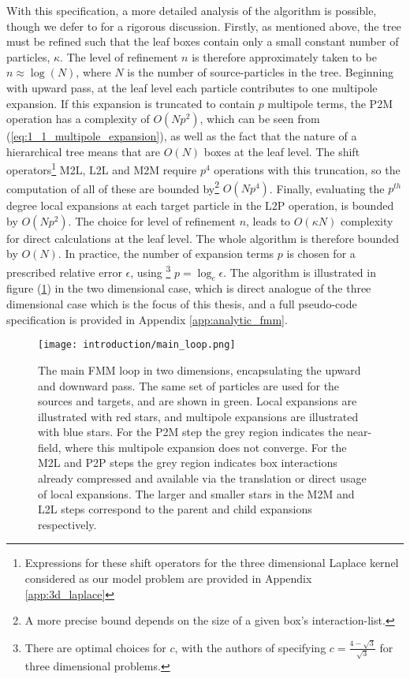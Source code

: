 With this specification, a more detailed analysis of the algorithm is possible,
though we defer to \cite{Greengard:1987:JCP} for a rigorous discussion.
Firstly, as mentioned above, the tree must be refined such that the leaf boxes
contain only a small constant number of particles, $\kappa$. The level of refinement $n$
is therefore approximately taken to be $n \approx \log(N)$, where $N$ is the number
of \gls{source-particles} in the tree. Beginning with upward pass, at the leaf level each particle contributes to one
multipole expansion. If this expansion is truncated to contain $p$ multipole terms, the
\gls{P2M} operation has a complexity of $O(Np^2)$, which can be seen from
(\ref{eq:1_1_multipole_expansion}), as well as the fact that the nature of a
hierarchical tree means that are $O(N)$ boxes at the leaf level. The shift operators\footnote{
    Expressions for these shift operators for the three dimensional Laplace kernel
    considered as our model problem are provided in Appendix \ref{app:3d_laplace}
} \gls{M2L}, \gls{L2L} and \gls{M2M} require $p^4$ operations with this truncation,
so the computation of all of these are bounded by\footnote{A more precise
bound depends on the size of a given box's \gls{interaction-list}.} $O(Np^4)$. Finally,
evaluating the $p^{th}$ degree local expansions at each target particle in the
\gls{L2P} operation, is bounded by $O(Np^2)$. The choice for level of refinement
$n$, leads to $O(\kappa N)$ complexity for direct calculations at the
leaf level. The whole algorithm is therefore bounded by $O(N)$.
In practice, the number of expansion terms $p$ is chosen for a prescribed relative error $\epsilon$, using
\footnote{There are optimal choices for $c$, with the authors of \cite{Ying:2004:JCP}
specifying $c=\frac{4-\sqrt{3}}{\sqrt{3}}$ for three dimensional problems.}
$p=\log_c \epsilon$. The algorithm is illustrated in figure (\ref{fig:1_1_main_loop})
in the two dimensional case, which is direct analogue of the three dimensional case
which is the focus of this thesis, and a full pseudo-code specification is
provided in Appendix \ref{app:analytic_fmm}.

\begin{figure}[!h]
    \centering
    {\texttt{[image: introduction/main\_loop.png]}}
  \caption{
      The main FMM loop in two dimensions, encapsulating the upward and downward
      pass. The same set of particles are used for the sources and targets, and
      are shown in green. Local expansions are illustrated with red stars, and
      multipole expansions are illustrated with blue stars. For the P2M step the
      grey region indicates the \gls{near-field}, where this multipole expansion
      does not converge. For the M2L and P2P steps the grey region indicates
      box interactions already compressed and available via the translation or
      direct usage of local expansions. The larger and smaller stars in the M2M and
      L2L steps correspond to the parent and child expansions respectively.
  }
  \label{fig:1_1_main_loop}
\end{figure}


